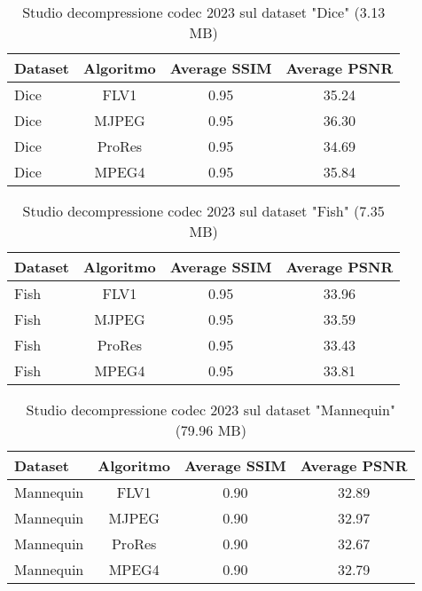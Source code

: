 \begin{table}[!ht]
\centering
\begin{tabular}{|l|c|c|c|}
\hline
Dataset               & Algoritmo & Average SSIM & Average PSNR \\ \hline
Dice                  & FLV1      & 0.95        & 35.24       \\ \hline
Dice                  & MJPEG     & 0.95        & 36.30       \\ \hline
Dice                  & ProRes    & 0.95        & 34.69       \\ \hline
Dice                  & MPEG4     & 0.95        & 35.84       \\ \hline
\end{tabular}
\caption{Studio decompressione codec 2023 sul dataset "Dice" (3.13 MB)}
\end{table}

\begin{table}[!ht]
\centering
\begin{tabular}{|l|c|c|c|}
\hline
Dataset               & Algoritmo & Average SSIM & Average PSNR \\ \hline
Fish                  & FLV1      & 0.95        & 33.96       \\ \hline
Fish                  & MJPEG     & 0.95        & 33.59       \\ \hline
Fish                  & ProRes    & 0.95        & 33.43       \\ \hline
Fish                  & MPEG4     & 0.95        & 33.81       \\ \hline
\end{tabular}
\caption{Studio decompressione codec 2023 sul dataset "Fish" (7.35 MB)}
\end{table}

\begin{table}[!ht]
\centering
\begin{tabular}{|l|c|c|c|}
\hline
Dataset               & Algoritmo & Average SSIM & Average PSNR \\ \hline
Mannequin             & FLV1      & 0.90        & 32.89       \\ \hline
Mannequin             & MJPEG     & 0.90        & 32.97       \\ \hline
Mannequin             & ProRes    & 0.90        & 32.67       \\ \hline
Mannequin             & MPEG4     & 0.90        & 32.79       \\ \hline
\end{tabular}
\caption{Studio decompressione codec 2023 sul dataset "Mannequin" (79.96 MB)}
\end{table}

